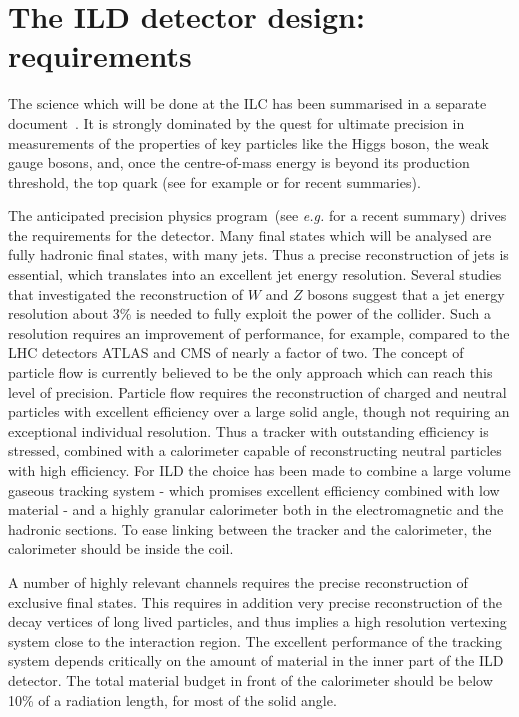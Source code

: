 \documentclass[%
 amsmath,amssymb,
 aps,
]{revtex4-1}
\begin{document}
\section{The ILD detector design: requirements}
The science which will be done at the ILC has been summarised in a separate document~\cite{ILCESU1}. It is strongly dominated by the quest for ultimate precision in measurements of the properties of key particles like the Higgs boson, the weak gauge bosons, and, once the centre-of-mass energy is beyond its production threshold, the top quark (see for example \cite{Fujii:2017vwa} or \cite{ILCESU1} for recent summaries). 


The anticipated precision physics program~(see {\it e.g.} \cite{Fujii:2017vwa} for a recent summary) drives the requirements for the detector. Many final states which will be analysed are fully hadronic final states, with many jets. Thus a precise reconstruction of jets is essential, which translates into an excellent jet energy resolution. Several studies that investigated the reconstruction of $W$ and $Z$ bosons suggest that a jet energy resolution about 3\% is needed to fully exploit the power of the collider. Such a resolution requires an improvement of performance, for example, compared to the LHC detectors ATLAS and CMS of nearly a factor of two. The concept of particle flow is currently believed to be the only approach which can reach this level of precision. Particle flow requires the reconstruction of charged and neutral particles with excellent efficiency over a large solid angle, though not requiring an exceptional  individual resolution. Thus a tracker with outstanding efficiency is stressed, combined with a calorimeter capable of reconstructing neutral particles with high efficiency. For ILD the choice has been made to combine a large volume gaseous tracking system - which promises excellent efficiency combined with low material - and a highly granular calorimeter both in the electromagnetic and the hadronic sections. To ease linking between the tracker and the calorimeter, the calorimeter should be inside the coil. 

A number of highly relevant channels requires the precise reconstruction of exclusive final states. This requires in addition very precise reconstruction of the decay vertices of long lived particles, and thus implies a high resolution vertexing system close to the interaction region. 
The excellent performance of the tracking system depends critically on the amount of material in the inner part of the ILD detector. The total material budget in front of the calorimeter should be below 10\% of a radiation length, for most of the solid angle.
\end{document}
